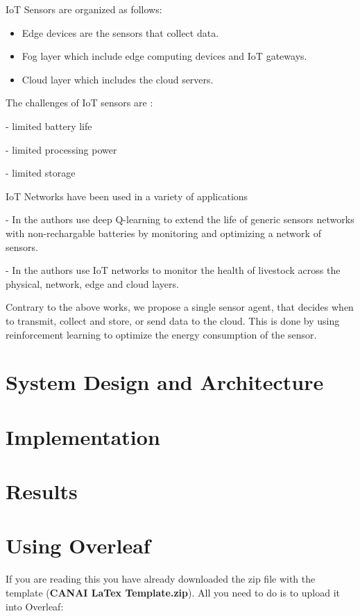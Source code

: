 \documentclass[10pt]{cai}
\begin{document}
IoT Sensors are organized as follows:
\begin{itemize}

\item Edge devices are the sensors that collect data.
\item Fog layer which include edge computing devices and IoT gateways.
\item Cloud layer which includes the cloud servers.
\end{itemize}

The challenges of IoT sensors are \cite{chenDeepReinforcementLearning2021}:

- limited battery life

- limited processing power

- limited storage


IoT Networks have been used in a variety of applications

- In \cite{hribarUsingDeepQLearning2019} the authors use deep Q-learning to extend the life of generic sensors networks with non-rechargable batteries by monitoring and optimizing a network of sensors.

- In \cite{yamsaniIoTBasedLivestockMonitoring2024} the authors use IoT networks to monitor the health of livestock across the physical, network, edge and cloud layers.

Contrary to the above works, we propose a single sensor agent, that decides when to transmit, collect and store, or send data to the cloud. This is done by using reinforcement learning to optimize the energy consumption of the sensor.

\section{System Design and Architecture}

\section{Implementation}

\section{Results}


\section{Using Overleaf}

If you are reading this you have already downloaded the zip file with the template (\textbf{CANAI \conferenceyear\xspace LaTex Template.zip}). All you need to do is to upload it into Overleaf:
\end{document}
